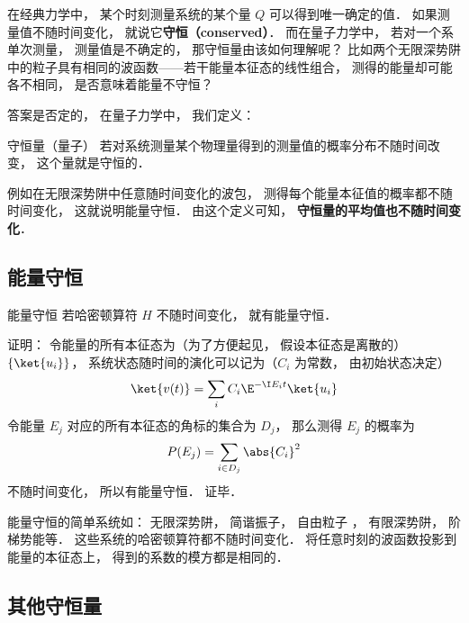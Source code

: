 

在经典力学中， 某个时刻测量系统的某个量 $Q$ 可以得到唯一确定的值． 如果测量值不随时间变化， 就说它\textbf{守恒（conserved）}． 而在量子力学中， 若对一个系单次测量， 测量值是不确定的， 那守恒量由该如何理解呢？ 比如两个无限深势阱中的粒子具有相同的波函数——若干能量本征态的线性组合， 测得的能量却可能各不相同， 是否意味着能量不守恒？

答案是否定的， 在量子力学中， 我们定义：
\begin{definition}{守恒量（量子）}
若对系统测量某个物理量得到的测量值的概率分布不随时间改变， 这个量就是守恒的．
\end{definition}

例如在无限深势阱中任意随时间变化的波包， 测得每个能量本征值的概率都不随时间变化， 这就说明能量守恒． 由这个定义可知， \textbf{守恒量的平均值也不随时间变化}．

\subsection{能量守恒}

\begin{theorem}{能量守恒}
若哈密顿算符 $H$ 不随时间变化， 就有能量守恒．
\end{theorem}
证明： 令能量的所有本征态为（为了方便起见， 假设本征态是离散的） $\{\ket{u_i}\}$， 系统状态随时间的演化可以记为（$C_i$ 为常数， 由初始状态决定）
\begin{equation}
\ket{v(t)} = \sum_i C_i \E^{-\I E_i t} \ket{u_i}
\end{equation}
令能量 $E_j$ 对应的所有本征态的角标的集合为 $D_j$， 那么测得 $E_j$ 的概率为
\begin{equation}
P(E_j) = \sum_{i \in D_j} \abs{C_i}^2
\end{equation}
不随时间变化， 所以有能量守恒． 证毕．

\begin{example}{}
能量守恒的简单系统如： 无限深势阱， 简谐振子， 自由粒子%
， 有限深势阱， 阶梯势能等． 这些系统的哈密顿算符都不随时间变化． 将任意时刻的波函数投影到能量的本征态上， 得到的系数的模方都是相同的．
\end{example}

\subsection{其他守恒量}

